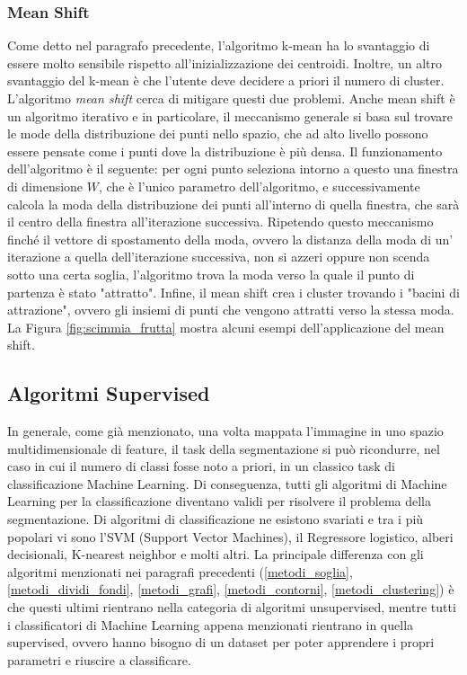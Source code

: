 \subsubsection{Mean Shift}
Come detto nel paragrafo precedente, l'algoritmo k-mean ha lo svantaggio di essere molto sensibile rispetto all'inizializzazione dei centroidi. Inoltre, un altro svantaggio del k-mean è che l'utente deve decidere a priori il numero di cluster. L'algoritmo \textit{mean shift} \cite{fukunaga1975estimation, comaniciu_mean} cerca di mitigare questi due problemi. Anche mean shift è un algoritmo iterativo e in particolare, il meccanismo generale si basa sul trovare le mode della distribuzione dei punti nello spazio, che ad alto livello possono essere pensate come i punti dove la distribuzione è più densa. Il funzionamento dell'algoritmo è il seguente: per ogni punto seleziona intorno a questo una finestra di dimensione $W$, che è l'unico parametro dell'algoritmo, e successivamente calcola la moda della distribuzione dei punti all'interno di quella finestra, che sarà il centro della finestra all'iterazione successiva. Ripetendo questo meccanismo finché il vettore di spostamento della moda, ovvero la distanza della moda di un' iterazione a quella dell'iterazione successiva, non si azzeri oppure non scenda sotto una certa soglia, l'algoritmo trova la moda verso la quale il punto di partenza è stato "attratto". Infine, il mean shift crea i cluster trovando i "bacini di attrazione", ovvero gli insiemi di punti che vengono attratti verso la stessa moda. La Figura \ref{fig:scimmia_frutta} mostra alcuni esempi dell'applicazione del mean shift.




\subsection{Algoritmi Supervised}
In generale, come già menzionato, una volta mappata l'immagine in uno spazio multidimensionale di feature, il task della segmentazione si può ricondurre, nel caso in cui il numero di classi fosse noto a priori, in un classico task di classificazione Machine Learning. Di conseguenza, tutti gli algoritmi  di Machine Learning per la classificazione diventano validi per risolvere il problema della segmentazione. Di algoritmi di classificazione ne esistono svariati e tra i più popolari vi sono l'SVM (Support Vector Machines), il Regressore logistico, alberi decisionali, K-nearest neighbor e molti altri. La principale differenza con gli algoritmi menzionati nei paragrafi precedenti (\ref{metodi_soglia}, \ref{metodi_dividi_fondi}, \ref{metodi_grafi}, \ref{metodi_contorni}, \ref{metodi_clustering}) è che questi ultimi rientrano nella categoria di algoritmi unsupervised, mentre tutti i classificatori di Machine Learning appena menzionati rientrano in quella supervised, ovvero hanno bisogno di un dataset per poter apprendere i propri parametri e riuscire a classificare.

